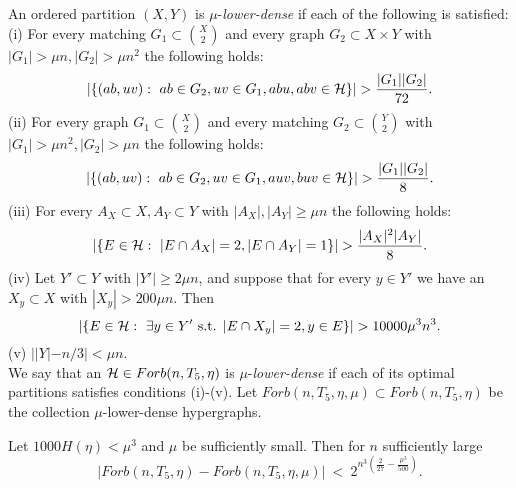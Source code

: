 \documentclass[11pt]{article}
\begin{document}
\begin{definition}\label{lowdef} An ordered partition $(X,Y)$ is $\mu$-{\it lower-dense} if each  of
 the following is satisfied:\\
 (i) For every matching $G_1\subset {X\choose 2}$ and every graph
 $G_2\subset X\times Y$ with $|G_1|>\mu n, |G_2|> \mu n^2$ the
 following holds:
$$|\{(ab,uv):\ ab\in G_2, uv\in G_1, abu, abv\in \HH  \}|>\frac{|G_1||G_2|}{72}.$$
(ii) For every graph $G_1\subset {X\choose 2}$ and every matching
 $G_2\subset {Y\choose 2}$ with $|G_1|>\mu n^2, |G_2|> \mu n$ the
 following holds:
$$|\{(ab,uv):\ ab\in G_2, uv\in G_1, auv, buv\in \HH  \}|>\frac{|G_1||G_2|}{8}.$$
(iii) For every $A_X\subset X, A_Y\subset Y$ with $|A_X|,|A_Y|\ge \mu n$
the following holds:
$$|\{E\in \HH: \ |E\cap A_X|=2, |E\cap A_Y|=1 \}|> \frac{|A_X|^2 |A_Y|}{8}.  $$
(iv) Let $Y'\subset Y$ with $|Y'| \ge 2\mu n$, and suppose that for
every
$y\in Y'$ we have an $X_y\subset X$ with $ |X_y|> 200 \mu n$. Then
$$|\{E\in \HH: \ \exists y\in Y' \text{ s.t. } |E\cap X_y|=2, y\in E \}|> 10000\mu^3 n^3.  $$
(v) $||Y|-n/3|<\mu n.$\\


We say that an $\mathcal{H}\in Forb(n,T_5,\eta)$ is $\mu$-{\it lower-dense}
if each of its optimal partitions  satisfies conditions (i)-(v). Let
$Forb(n,T_5,\eta,\mu)\subset Forb(n,T_5,\eta)$ be the collection
$\mu$-{lower-dense} hypergraphs.
\end{definition}

\begin{lemma}\label{t5lower}
Let  $1000H(\eta)< \mu^3$ and $\mu$ be sufficiently small. Then for
$n$ sufficiently large
$$|Forb(n,T_5,\eta)-Forb(n,T_5,\eta,\mu)|\ <\
2^{n^3(\frac{2}{27}-\frac{\mu^3}{500})}.$$
\end{lemma}
\end{document}
